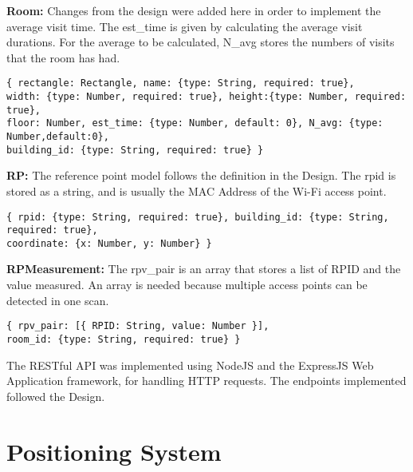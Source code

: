 \noindent
\textbf{Room:}
Changes from the design were added here in order to implement the average visit time. The est\_time is given by calculating the average visit durations. For the average to be calculated, N\_avg stores the numbers of visits that the room has had.
\begin{lstlisting}
{ rectangle: Rectangle, name: {type: String, required: true},
width: {type: Number, required: true}, height:{type: Number, required: true},
floor: Number, est_time: {type: Number, default: 0}, N_avg: {type: Number,default:0},
building_id: {type: String, required: true} }
\end{lstlisting}

\noindent
\textbf{RP:}
The reference point model follows the definition in the Design. The rpid is stored as a string, and is usually the MAC Address of the Wi-Fi access point.
\begin{lstlisting}
{ rpid: {type: String, required: true}, building_id: {type: String, required: true},
coordinate: {x: Number, y: Number} }
\end{lstlisting}

\noindent
\textbf{RPMeasurement:}
The rpv\_pair is an array that stores a list of RPID and the value measured. An array is needed because multiple access points can be detected in one scan. 
\begin{lstlisting}
{ rpv_pair: [{ RPID: String, value: Number }], 
room_id: {type: String, required: true} }
\end{lstlisting}

The RESTful API was implemented using NodeJS and the ExpressJS Web Application framework, for handling HTTP requests. The endpoints implemented followed the Design.

\section{Positioning System}

